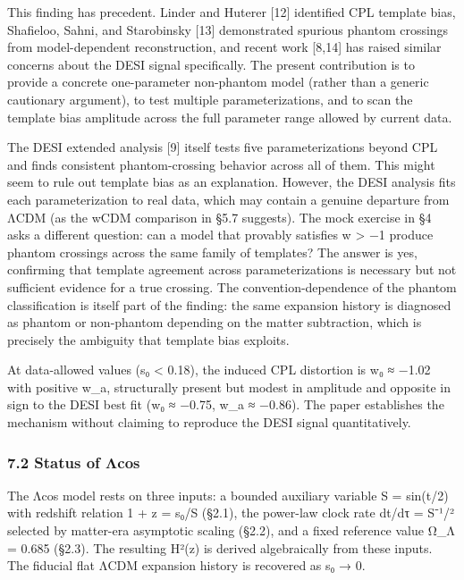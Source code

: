 This finding has precedent. Linder and Huterer {[}12{]} identified CPL
template bias, Shafieloo, Sahni, and Starobinsky {[}13{]} demonstrated
spurious phantom crossings from model-dependent reconstruction, and
recent work {[}8,14{]} has raised similar concerns about the DESI signal
specifically. The present contribution is to provide a concrete
one-parameter non-phantom model (rather than a generic cautionary
argument), to test multiple parameterizations, and to scan the template
bias amplitude across the full parameter range allowed by current data.

The DESI extended analysis {[}9{]} itself tests five parameterizations
beyond CPL and finds consistent phantom-crossing behavior across all of
them. This might seem to rule out template bias as an explanation.
However, the DESI analysis fits each parameterization to real data,
which may contain a genuine departure from ΛCDM (as the wCDM comparison
in §5.7 suggests). The mock exercise in §4 asks a different question:
can a model that provably satisfies w \textgreater{} −1 produce phantom
crossings across the same family of templates? The answer is yes,
confirming that template agreement across parameterizations is necessary
but not sufficient evidence for a true crossing. The
convention-dependence of the phantom classification is itself part of
the finding: the same expansion history is diagnosed as phantom or
non-phantom depending on the matter subtraction, which is precisely the
ambiguity that template bias exploits.

At data-allowed values (s₀ \textless{} 0.18), the induced CPL distortion
is w₀ ≈ −1.02 with positive w\_a, structurally present but modest in
amplitude and opposite in sign to the DESI best fit (w₀ ≈ −0.75, w\_a ≈
−0.86). The paper establishes the mechanism without claiming to
reproduce the DESI signal quantitatively.

\subsubsection{7.2 Status of Λcos}\label{status-of-ux3bbcos}

The Λcos model rests on three inputs: a bounded auxiliary variable S =
sin(t/2) with redshift relation 1 + z = s₀/S (§2.1), the power-law clock
rate dt/dτ = S⁻¹/² selected by matter-era asymptotic scaling (§2.2), and
a fixed reference value Ω\_Λ = 0.685 (§2.3). The resulting H²(z) is
derived algebraically from these inputs. The fiducial flat ΛCDM
expansion history is recovered as s₀ → 0.


